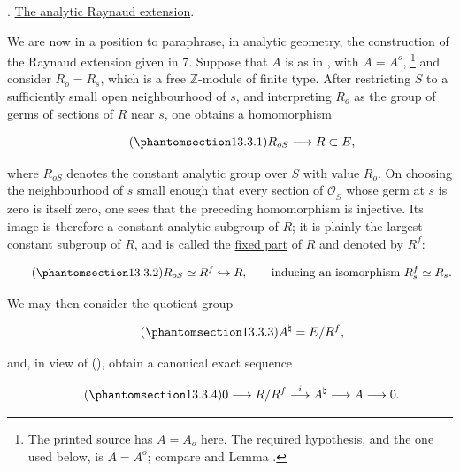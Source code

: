 \medskip
\noindent
{}. \underline{The analytic Raynaud extension}.

We are now in a position to paraphrase, in analytic geometry, the
construction of the Raynaud extension given in 7. Suppose that $A$ is
as in , with $A=A^o$,
\footnote{The printed source has $A=A_o$ here. The required hypothesis,
and the one used below, is $A=A^o$; compare  and Lemma .}
and consider $R_o=R_s$, which is a free $\mathbb Z$-module of finite
type. After restricting $S$ to a sufficiently small open neighbourhood
of $s$, and interpreting $R_o$ as the group of germs of sections of $R$
near $s$, one obtains a homomorphism

\begin{equation}\tag{\SGARefTarget{sga7.sga7i.eix.n13-3-1}{13.3.1}}
 R_{oS}\longrightarrow R\subset E,
\end{equation}

\noindent
where $R_{oS}$ denotes the constant analytic group over $S$ with value
$R_o$. On choosing the neighbourhood of $s$ small enough that every
section of $\underline{\mathcal O}_S$ whose germ at $s$ is zero is itself
zero, one sees that the preceding homomorphism is injective. Its image is
therefore a constant analytic subgroup of $R$; it is plainly the largest
constant subgroup of $R$, and is called the \underline{fixed part} of
$R$ and denoted by $R^f$:

\begin{equation}\tag{\SGARefTarget{sga7.sga7i.eix.n13-3-2}{13.3.2}}
 R_{oS}\simeq R^f\hookrightarrow R,
 \qquad\text{inducing an isomorphism }R_s^f\simeq R_s.
\end{equation}

\noindent
We may then consider the quotient group

\begin{equation}\tag{\SGARefTarget{sga7.sga7i.eix.n13-3-3}{13.3.3}}
 A^\natural=E/R^f,
\end{equation}

\noindent
and, in view of (), obtain a canonical exact sequence

\begin{equation}\tag{\SGARefTarget{sga7.sga7i.eix.n13-3-4}{13.3.4}}
 0\longrightarrow R/R^f\stackrel{i}{\longrightarrow}A^\natural
 \longrightarrow A\longrightarrow0.
\end{equation}


